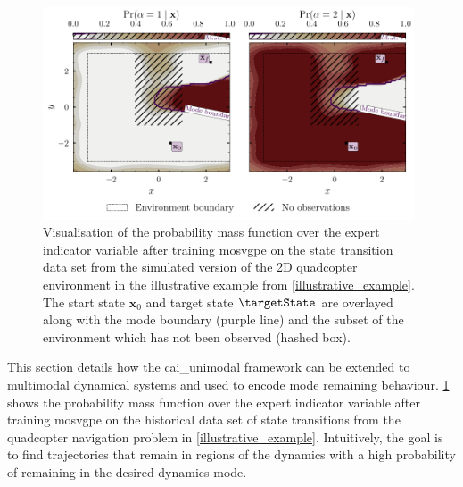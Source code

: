 \documentclass{mimosis-class/mimosis}
\numberwithin{equation}{chapter}
\newcommand{\numData}{\ensuremath{t}}
\newcommand{\modeInd}{\ensuremath{k}}
\newcommand{\singleData}[1]{\ensuremath{#1_{\numData}}}
\newcommand{\state}{\ensuremath{\mathbf{x}}}
\newcommand{\control}{\ensuremath{\mathbf{u}}}
\newcommand{\modeVar}{\ensuremath{\alpha}}
\newcommand{\modeVarn}{\ensuremath{\singleData{\modeVar}}}
\newcommand{\modeVarK}{\ensuremath{\modeVarn=\modeInd}}
\begin{document}
{\renewcommand{\modeVarK}{\ensuremath{\modeVar_{\timeInd} = \modeInd}}
\renewcommand{\modeProb}{\ensuremath{\Pr(\modeVar_\timeInd=\desiredMode \mid \state_\timeInd)}}
\renewcommand{\terminalCostDist}{\ensuremath{\Pr(\optimalVar_\TimeInd=1, \modeVar_\TimeInd=\desiredMode \mid \state_\TimeInd)}}
\renewcommand{\terminalModeProbDist}{\ensuremath{\Pr(\modeVar_\TimeInd=\desiredMode \mid \state_\TimeInd)}}
\renewcommand{\jointDist}{\ensuremath{p(\optimalVarTraj, \modeVarTraj, \stateTraj, \controlTraj \mid \state_0})}

\renewcommand{\transitionDistOptimal}{\ensuremath{p(\state_{\timeInd+1} \mid \state_\timeInd, \control_\timeInd, \optimalVarTraj_{0:\timeInd}, \modeVarTraj_{0:\timeInd})}}
\renewcommand{\transitionDist}{\ensuremath{p(\state_{\timeInd+1} \mid \state_\timeInd, \control_\timeInd)}}
\renewcommand{\transitionDistK}{\ensuremath{p(\state_{\timeInd+1} \mid \state_\timeInd, \control_\timeInd, \modeVarK)}}

\renewcommand{\transitionVarDistK}{\ensuremath{q(\state_{\timeInd+1} \mid \state_0, \modeVarTraj_{0:\timeInd})}}
\begin{figure}[t!]
\centering
\includegraphics[width=0.98\textwidth]{./images/mode-opt/env/scenario_7/mosvgpe/mixing_probs_no_obs.pdf}
\caption[\acrshort{mosvgpe}'s mixing probabilities after training on simulated quadcopter data set from Environment 1]{
Visualisation of the probability mass function over the expert indicator variable after training \acrshort{mosvgpe}
on the state transition data set from the simulated version of the 2D quadcopter environment
in the illustrative example from \cref{illustrative_example}.
The start state $\state_0$ and target state $\targetState$ are overlayed along with the mode boundary (purple line)
and the subset of the environment which has not been observed (hashed box).}
\label{eq-traj-opt-gating-network-prob-post-inf}
\end{figure}
This section details how the \acrfull{cai_unimodal} framework can be extended to multimodal dynamical systems and
used to encode mode remaining behaviour.
\cref{eq-traj-opt-gating-network-prob-post-inf} shows the probability mass function over the expert indicator variable
after training \acrshort{mosvgpe} on the historical data set of state transitions from the
quadcopter navigation problem in \cref{illustrative_example}.
Intuitively, the goal is to find trajectories that remain in regions of the dynamics with a high probability of
remaining in the desired dynamics mode.

}
\end{document}
